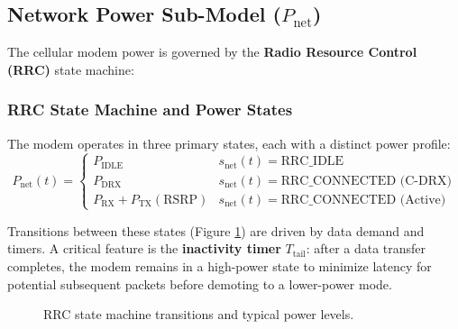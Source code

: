 \documentclass{mcmthesis}
\begin{document}
\subsection{Network Power Sub-Model ($P_{\text{net}}$)}
\label{sec:network}

The cellular modem power is governed by the \textbf{Radio Resource Control (RRC)} state machine:

\subsubsection{RRC State Machine and Power States}
\label{sec:network:rrc}

The modem operates in three primary states, each with a distinct power profile:
\begin{equation}
  \boxed{P_{\text{net}}(t) = \begin{cases} 
    P_{\text{IDLE}}    & s_{\text{net}}(t) = \text{RRC\_IDLE} \\ 
    P_{\text{DRX}}     & s_{\text{net}}(t) = \text{RRC\_CONNECTED (C-DRX)} \\ 
    P_{\text{RX}} + P_{\text{TX}}(\text{RSRP}) & s_{\text{net}}(t) = \text{RRC\_CONNECTED (Active)}
  \end{cases}}
  \label{eq:Pnet}
\end{equation}

Transitions between these states (Figure \ref{fig:rrc_states}) are driven by data demand and timers. A critical feature is the \textbf{inactivity timer} $T_{\text{tail}}$: after a data transfer completes, the modem remains in a high-power state to minimize latency for potential subsequent packets before demoting to a lower-power mode.

\begin{figure}[htbp]
  \centering
  \caption{RRC state machine transitions and typical power levels.}
  \label{fig:rrc_states}
\end{figure}
\end{document}
